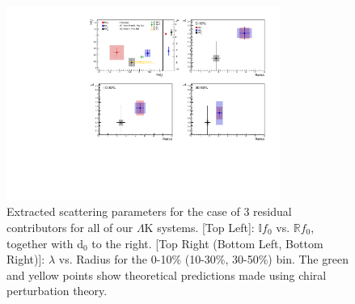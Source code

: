 \documentclass[/home/jesse/Analysis/FemtoAnalysis/AnalysisNotes/AnalysisNoteJBuxton.tex]{subfiles}
\begin{document}
\begin{figure}[h]
  \centering
  \includegraphics[width=0.80\textwidth]{7_ResultsAndDiscussion/Figures/CompareAllScattParams_Comp3An_3Res.pdf}
  \caption[Extracted Scattering Parameters: 3 Residuals in Fit]{Extracted scattering parameters for the case of 3 residual contributors for all of our $\Lambda$K systems.  [Top Left]: $\mathbb{I}f_{0}$ vs. $\mathbb{R}f_{0}$, together with d$_{0}$ to the right.  [Top Right (Bottom Left, Bottom Right)]: $\lambda$ vs. Radius for the 0-10\% (10-30\%, 30-50\%) bin.  The green \cite{Liu:2006xja} and yellow \cite{Mai:2009ce} points show theoretical predictions made using chiral perturbation theory.}
  \label{fig:ScattParams_Final}
\end{figure}

\clearpage





\end{document}
